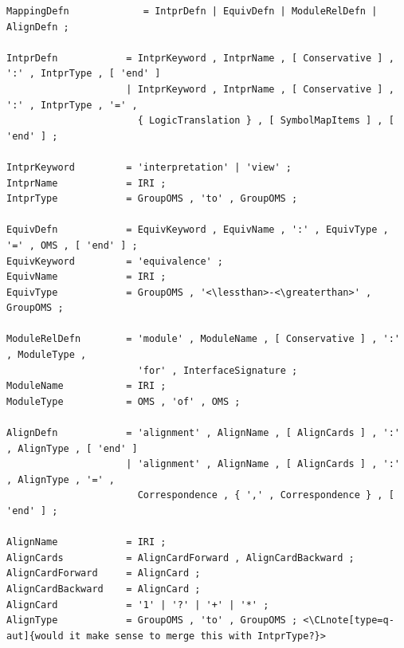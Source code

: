 \documentclass[10pt,%
\ifpretendfinal
final%
\else
draft%
\fi,
]{scrreprt}
\makeatletter
\newcommand*\CommentAuthor{}
\renewcommand*\CommentAuthor{#1}}
\newcommand*\CommentDate{}
\renewcommand*\CommentDate{#1}}
\newcommand*\CommentId{}
\renewcommand*\CommentId{#1}}
\newcommand*\CommentType{}
\renewcommand*\CommentType{#1}}
\newcommand*{\SetCommentColorByType}[1]{%
\edef\localType{{#1}}%
\expandafter\ifstrequal\localType{q-aut}{\colorlet{CommentColor}{red}}{%
\expandafter\ifstrequal\localType{q-all}{\colorlet{CommentColor}{orange}}{%
\expandafter\ifstrequal\localType{todo}{\colorlet{CommentColor}{orange}}{%
\expandafter\ifstrequal\localType{fyi}{\colorlet{CommentColor}{lightgray}}{%
\colorlet{CommentColor}{yellow}}}}}}
\newcommand*{\SetCommentPrefixByType}[1]{%
\edef\localType{{#1}}%
\expandafter\@ifmtarg\localType{%
\edef\CommentPrefix{}%
}{%
\caseupper[q]{#1}%
\edef\CommentPrefix{\thestring: }%
}}
\newcommand*{\initComment}[1]{%
\setkeys{Comment}{#1}%
\SetCommentColorByType{\CommentType}%
\relax%
\SetCommentPrefixByType{\CommentType}%
\relax%
}
\newcommand*{\todonote}[2][]{%
\initComment{#1}%
\pdfcomment[author=\CommentAuthor,color=CommentColor,date=\CommentDate,id=\CommentId]{%
\CommentPrefix
#2}}
\renewcommand*{\todonote}[2][]{%
\initComment{#1}%
\ednote{\CommentPrefix #2}}
\newcommand*{\CLnote}[2][author=Christoph Lange]{%
\todonote[author=Christoph Lange,#1]{#2} 
}
\makeatother
\begin{document}
\newcommand*{\lessthan}{<}
\newcommand*{\greaterthan}{>}
\begin{lstlisting}[language=ebnf,escapeinside={<>},mathescape]
MappingDefn             = IntprDefn | EquivDefn | ModuleRelDefn | AlignDefn ;

IntprDefn            = IntprKeyword , IntprName , [ Conservative ] , ':' , IntprType , [ 'end' ]
                     | IntprKeyword , IntprName , [ Conservative ] , ':' , IntprType , '=' ,
                       { LogicTranslation } , [ SymbolMapItems ] , [ 'end' ] ;

IntprKeyword         = 'interpretation' | 'view' ;
IntprName            = IRI ;
IntprType            = GroupOMS , 'to' , GroupOMS ;

EquivDefn            = EquivKeyword , EquivName , ':' , EquivType , '=' , OMS , [ 'end' ] ;
EquivKeyword         = 'equivalence' ;
EquivName            = IRI ;
EquivType            = GroupOMS , '<\lessthan>-<\greaterthan>' , GroupOMS ;

ModuleRelDefn        = 'module' , ModuleName , [ Conservative ] , ':' , ModuleType ,
                       'for' , InterfaceSignature ;
ModuleName           = IRI ;
ModuleType           = OMS , 'of' , OMS ;

AlignDefn            = 'alignment' , AlignName , [ AlignCards ] , ':' , AlignType , [ 'end' ]
                     | 'alignment' , AlignName , [ AlignCards ] , ':' , AlignType , '=' ,
                       Correspondence , { ',' , Correspondence } , [ 'end' ] ;

AlignName            = IRI ;
AlignCards           = AlignCardForward , AlignCardBackward ;
AlignCardForward     = AlignCard ;
AlignCardBackward    = AlignCard ;
AlignCard            = '1' | '?' | '+' | '*' ;
AlignType            = GroupOMS , 'to' , GroupOMS ; <\CLnote[type=q-aut]{would it make sense to merge this with IntprType?}> 


\end{lstlisting}
\end{document}
